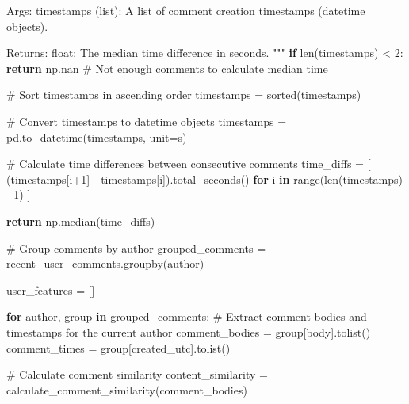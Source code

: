 \documentclass[
  12pt,
  letterpaper,
  DIV=11,
  numbers=noendperiod]{scrartcl}
\newenvironment{Shaded}{\begin{snugshade}}{\end{snugshade}}
\newcommand{\BuiltInTok}[1]{\textcolor[rgb]{0.00,0.23,0.31}{#1}}
\newcommand{\CommentTok}[1]{\textcolor[rgb]{0.37,0.37,0.37}{#1}}
\newcommand{\ControlFlowTok}[1]{\textcolor[rgb]{0.00,0.23,0.31}{\textbf{#1}}}
\newcommand{\DecValTok}[1]{\textcolor[rgb]{0.68,0.00,0.00}{#1}}
\newcommand{\KeywordTok}[1]{\textcolor[rgb]{0.00,0.23,0.31}{\textbf{#1}}}
\newcommand{\NormalTok}[1]{\textcolor[rgb]{0.00,0.23,0.31}{#1}}
\newcommand{\OperatorTok}[1]{\textcolor[rgb]{0.37,0.37,0.37}{#1}}
\newcommand{\StringTok}[1]{\textcolor[rgb]{0.13,0.47,0.30}{#1}}
\begin{document}
\begin{Shaded}
\begin{Highlighting}[]
\CommentTok{    Args:}
\CommentTok{        timestamps (list): A list of comment creation timestamps (datetime objects).}

\CommentTok{    Returns:}
\CommentTok{        float: The median time difference in seconds.}
\CommentTok{    """}
    \ControlFlowTok{if} \BuiltInTok{len}\NormalTok{(timestamps) }\OperatorTok{\textless{}} \DecValTok{2}\NormalTok{:}
        \ControlFlowTok{return}\NormalTok{ np.nan  }\CommentTok{\# Not enough comments to calculate median time}

    \CommentTok{\# Sort timestamps in ascending order}
\NormalTok{    timestamps }\OperatorTok{=} \BuiltInTok{sorted}\NormalTok{(timestamps)}

    \CommentTok{\# Convert timestamps to datetime objects}
\NormalTok{    timestamps }\OperatorTok{=}\NormalTok{ pd.to\_datetime(timestamps, unit}\OperatorTok{=}\StringTok{\textquotesingle{}s\textquotesingle{}}\NormalTok{)}

    \CommentTok{\# Calculate time differences between consecutive comments}
\NormalTok{    time\_diffs }\OperatorTok{=}\NormalTok{ [}
\NormalTok{        (timestamps[i}\OperatorTok{+}\DecValTok{1}\NormalTok{] }\OperatorTok{{-}}\NormalTok{ timestamps[i]).total\_seconds()}
        \ControlFlowTok{for}\NormalTok{ i }\KeywordTok{in} \BuiltInTok{range}\NormalTok{(}\BuiltInTok{len}\NormalTok{(timestamps) }\OperatorTok{{-}} \DecValTok{1}\NormalTok{)}
\NormalTok{    ]}

    \ControlFlowTok{return}\NormalTok{ np.median(time\_diffs)}

\CommentTok{\# Group comments by author}
\NormalTok{grouped\_comments }\OperatorTok{=}\NormalTok{ recent\_user\_comments.groupby(}\StringTok{\textquotesingle{}author\textquotesingle{}}\NormalTok{)}

\NormalTok{user\_features }\OperatorTok{=}\NormalTok{ []}

\ControlFlowTok{for}\NormalTok{ author, group }\KeywordTok{in}\NormalTok{ grouped\_comments:}
    \CommentTok{\# Extract comment bodies and timestamps for the current author}
\NormalTok{    comment\_bodies }\OperatorTok{=}\NormalTok{ group[}\StringTok{\textquotesingle{}body\textquotesingle{}}\NormalTok{].tolist()}
\NormalTok{    comment\_times }\OperatorTok{=}\NormalTok{ group[}\StringTok{\textquotesingle{}created\_utc\textquotesingle{}}\NormalTok{].tolist()}

    \CommentTok{\# Calculate comment similarity}
\NormalTok{    content\_similarity }\OperatorTok{=}\NormalTok{ calculate\_comment\_similarity(comment\_bodies)}


\end{Highlighting}
\end{Shaded}
\end{document}
